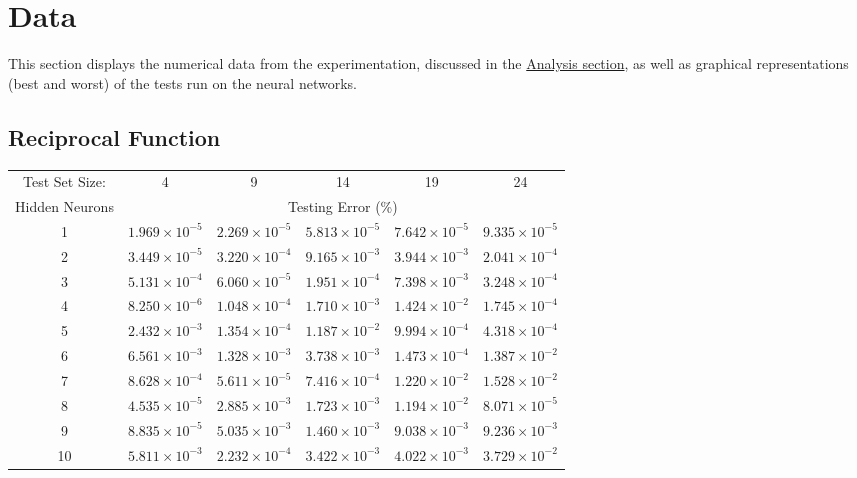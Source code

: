 \documentclass{article}
\begin{document}
\section{Data} \label{S3}
This section displays the numerical data from the experimentation, discussed in the \hyperref[S4]{Analysis section}, as well as graphical representations (best and worst) of the tests run on the neural networks.\\

	\subsection{Reciprocal Function}
		\begin{minipage}{\linewidth}
			\centering
			\begin{tabular}{c|ccccc}\label{T1}
				Test Set Size:  & 4 & 9 & 14 & 19 & 24 \\
				Hidden Neurons  & \multicolumn{5}{c}{Testing Error (\%)} \\
				\hline\noalign{\smallskip}
				1	& $1.969\times 10^{-5}$	& $2.269\times 10^{-5}$ & $5.813\times 10^{-5}$ & $7.642\times 10^{-5}$ & $9.335\times 10^{-5}$ \\
				2	& $3.449\times 10^{-5}$	& $3.220\times 10^{-4}$ & $9.165\times 10^{-3}$ & $3.944\times 10^{-3}$ & $2.041\times 10^{-4}$ \\
				3	& $5.131\times 10^{-4}$	& $6.060\times 10^{-5}$ & $1.951\times 10^{-4}$ & $7.398\times 10^{-3}$ & $3.248\times 10^{-4}$ \\
				4	& $8.250\times 10^{-6}$	& $1.048\times 10^{-4}$ & $1.710\times 10^{-3}$ & $1.424\times 10^{-2}$ & $1.745\times 10^{-4}$ \\
				5	& $2.432\times 10^{-3}$	& $1.354\times 10^{-4}$ & $1.187\times 10^{-2}$ & $9.994\times 10^{-4}$ & $4.318\times 10^{-4}$ \\
				6	& $6.561\times 10^{-3}$	& $1.328\times 10^{-3}$ & $3.738\times 10^{-3}$ & $1.473\times 10^{-4}$ & $1.387\times 10^{-2}$ \\
				7	& $8.628\times 10^{-4}$	& $5.611\times 10^{-5}$ & $7.416\times 10^{-4}$ & $1.220\times 10^{-2}$ & $1.528\times 10^{-2}$ \\
				8	& $4.535\times 10^{-5}$	& $2.885\times 10^{-3}$ & $1.723\times 10^{-3}$ & $1.194\times 10^{-2}$ & $8.071\times 10^{-5}$ \\
				9	& $8.835\times 10^{-5}$	& $5.035\times 10^{-3}$ & $1.460\times 10^{-3}$ & $9.038\times 10^{-3}$ & $9.236\times 10^{-3}$ \\
				10	& $5.811\times 10^{-3}$	& $2.232\times 10^{-4}$ & $3.422\times 10^{-3}$ & $4.022\times 10^{-3}$ & $3.729\times 10^{-2}$ \\
			\end{tabular}
		\end{minipage}	
		
\end{document}
